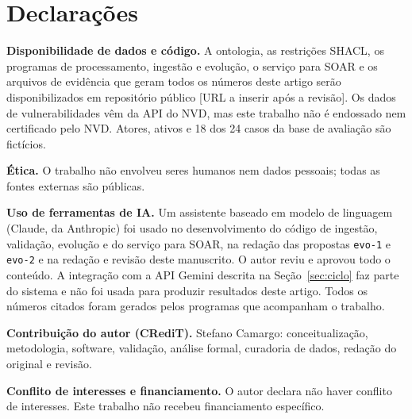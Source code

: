 \documentclass[12pt]{article}
\begin{document}
\section*{Declarações}

\textbf{Disponibilidade de dados e código.} A ontologia, as restrições SHACL, os programas de processamento, ingestão e evolução, o serviço para SOAR e os arquivos de evidência que geram todos os números deste artigo serão disponibilizados em repositório público [URL a inserir após a revisão]. Os dados de vulnerabilidades vêm da API do NVD, mas este trabalho não é endossado nem certificado pelo NVD. Atores, ativos e 18 dos 24 casos da base de avaliação são fictícios.

\textbf{Ética.} O trabalho não envolveu seres humanos nem dados pessoais; todas as fontes externas são públicas.

\textbf{Uso de ferramentas de IA.} Um assistente baseado em modelo de linguagem (Claude, da Anthropic) foi usado no desenvolvimento do código de ingestão, validação, evolução e do serviço para SOAR, na redação das propostas \texttt{evo-1} e \texttt{evo-2} e na redação e revisão deste manuscrito. O autor reviu e aprovou todo o conteúdo. A integração com a API Gemini descrita na Seção~\ref{sec:ciclo} faz parte do sistema e não foi usada para produzir resultados deste artigo. Todos os números citados foram gerados pelos programas que acompanham o trabalho.

\textbf{Contribuição do autor (CRediT).} Stefano Camargo: conceitualização, metodologia, software, validação, análise formal, curadoria de dados, redação do original e revisão.

\textbf{Conflito de interesses e financiamento.} O autor declara não haver conflito de interesses. Este trabalho não recebeu financiamento específico.



\end{document}
